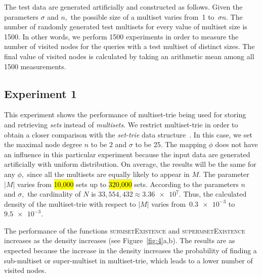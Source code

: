 \documentclass[algorithms,article,accept,pdftex,moreauthors]{Definitions/mdpi}
\begin{document}
The test data are generated artificially and constructed as follows. Given the 
parameters $\sigma$ and $n,$ the possible size of a multiset varies from~1 
to~$\sigma n.$ The number of randomly generated test multisets for every 
value of multiset size is 1500. In other words, we perform 1500 experiments 
in order to measure the number of visited nodes for the queries with a test multiset 
of distinct sizes. The final value of visited nodes is calculated by taking an 
arithmetic mean among all 1500 measurements.


\subsection{Experiment 1} \label{s:exp1}
This experiment shows the performance of multiset-trie being used for storing 
and retrieving \emph{sets} instead of \emph{multisets}. We restrict multiset-trie in order 
to obtain a closer comparison with the \emph{set-trie} data structure~\cite{savnik2013index}.
In this case, we set the maximal node degree $n$ to be $2$ and $\sigma$ to be 25. 
The mapping $\phi$ does not have an influence in this particular experiment
because the input data are generated artificially with uniform distribution. On 
average, the results will be the same for any $\phi,$ since all the multisets are 
equally likely to appear in $M.$ The parameter $|M|$ varies from \hl{10,000} %
 sets up 
to \hl{320,000} sets. According to the parameters $n$ and $\sigma,$ the cardinality of 
$N$ is $33,554,432\approx \num{3.36e+7}.$ Thus, the calculated density of the 
multiset-trie with respect to $|M|$ varies from~$\num{0.3e-3}$ to~$\num{9.5e-3}.$


The performance of the functions \textsc{submsetExistence} and 
\textsc{supermsetExistence} increases as the density increases (see Figure~\ref{fig:4}a,b). The results are as expected because the increase in the 
density increases the probability of finding a sub-multiset or super-multiset in 
multiset-trie, which leads to a lower number of visited nodes. 
\end{document}

